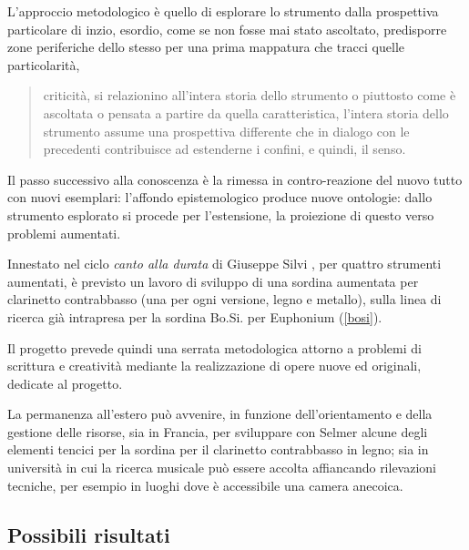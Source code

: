 \documentclass{gs-adonis}
\begin{document}
L'approccio metodologico è quello di esplorare lo strumento dalla prospettiva
particolare di inzio, esordio, come se non fosse mai stato ascoltato,
predisporre zone periferiche dello stesso per una prima mappatura che tracci
quelle particolarità,

\begin{quote}
  criticità, si relazionino all'intera storia dello strumento o piuttosto
  come è ascoltata o pensata a partire da quella caratteristica, l'intera
  storia dello strumento assume una prospettiva differente che in dialogo con
  le precedenti contribuisce ad estenderne i confini, e quindi, il senso.
\end{quote}


Il passo successivo alla conoscenza è la rimessa in contro-reazione del nuovo
tutto con nuovi esemplari: l'affondo epistemologico produce nuove ontologie:
dallo strumento esplorato si procede per l'estensione, la proiezione di questo
verso problemi aumentati.

Innestato nel ciclo \emph{canto alla durata} di Giuseppe Silvi
\cite{gs:cad, gs:artQ13}, per quattro strumenti aumentati, è previsto un lavoro
di sviluppo di una sordina aumentata per clarinetto contrabbasso (una per ogni
versione, legno e metallo), sulla linea di ricerca già intrapresa per la sordina
Bo.Si. per Euphonium (\ref{bosi}).

Il progetto prevede quindi una serrata metodologica attorno a problemi di
scrittura e creatività mediante la realizzazione di opere nuove ed originali,
dedicate al progetto.

La permanenza all'estero può avvenire, in funzione dell'orientamento e della
gestione delle risorse, sia in Francia, per sviluppare con Selmer alcune degli
elementi tencici per la sordina per il clarinetto contrabbasso in legno; sia
in università in cui la ricerca musicale può essere accolta affiancando
rilevazioni tecniche, per esempio in luoghi dove è accessibile una camera anecoica.
\subsection{Possibili risultati}%
\end{document}
